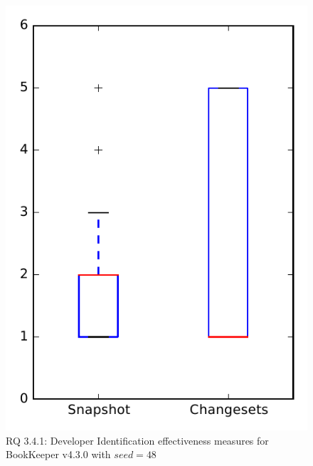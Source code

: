 
\begin{figure}
\centering
\includegraphics[height=0.4\textheight]{figures/dit_seed/rq1_bookkeeper_48}
\caption{RQ 3.4.1: Developer Identification effectiveness measures for BookKeeper v4.3.0 with $seed=48$}
\label{fig:dit_seed:rq1:bookkeeper}
\end{figure}
